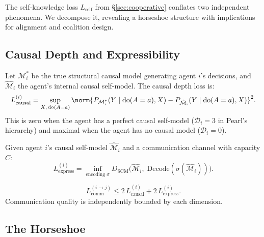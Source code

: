 The self-knowledge loss $L_{\text{self}}$ from \S\ref{sec:cooperative} conflates two independent phenomena. We decompose it, revealing a horseshoe structure with implications for alignment and coalition design.

\subsection{Causal Depth and Expressibility}

\begin{definition}
\label{def:causal-depth-ch3}
Let $\mathcal{M}_i^*$ be the true structural causal model generating agent $i$'s decisions, and $\hat{\mathcal{M}}_i$ the agent's internal causal self-model. The causal depth loss is:
\begin{equation}
    L_{\text{causal}}^{(i)} = \sup_{X,\, \text{do}(A=a)} \norm{P_{\mathcal{M}_i^*}(Y \mid \text{do}(A=a), X) - P_{\hat{\mathcal{M}}_i}(Y \mid \text{do}(A=a), X)}^2.
\end{equation}
This is zero when the agent has a perfect causal self-model ($\mathcal{D}_i = 3$ in Pearl's hierarchy) and maximal when the agent has no causal model ($\mathcal{D}_i = 0$).
\end{definition}

\begin{definition}
\label{def:express-ch3}
Given agent $i$'s causal self-model $\hat{\mathcal{M}}_i$ and a communication channel with capacity $C$:
\begin{equation}
    L_{\text{express}}^{(i)} = \inf_{\text{encoding } \sigma} D_{\text{SCM}}\bigl(\hat{\mathcal{M}}_i,\; \text{Decode}(\sigma(\hat{\mathcal{M}}_i))\bigr).
\end{equation}
\end{definition}

\begin{theorem}
\label{thm:vibing-decomp}
\begin{equation}
    L_{\text{comm}}^{(i \to j)} \leq 2\, L_{\text{causal}}^{(i)} + 2\, L_{\text{express}}^{(i)}.
\end{equation}
Communication quality is independently bounded by each dimension.
\end{theorem}


\subsection{The Horseshoe}

